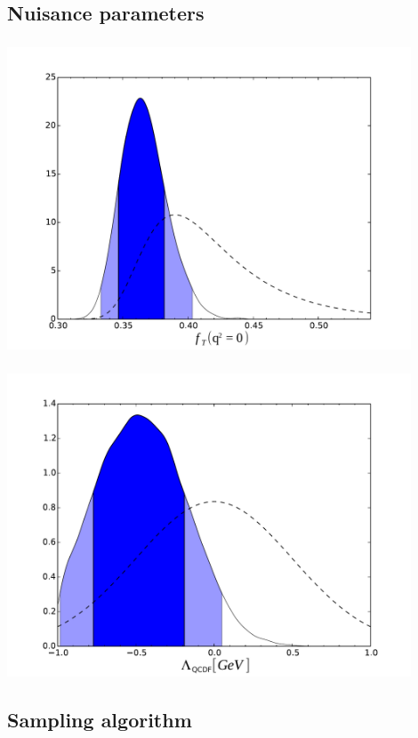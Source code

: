 \documentclass[english]{beamer}
\newcommand{\slide}[2][t]{\begin{frame}[#1] \frametitle{\insertsubsectionhead} #2 \end{frame}}
\begin{document}
\subsection{Nuisance parameters}

\slide[t]{

    \begin{center}
        \includegraphics[width=0.9\textwidth]{figures/FF_ft0}
    \end{center}

}

\slide{

    \begin{center}
        \includegraphics[width=0.9\textwidth]{figures/SL_large_recoil}
    \end{center}

}

\subsection{Sampling algorithm}
\end{document}
